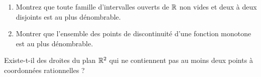 \documentclass[a4paper,12pt,reqno]{amsart}
\begin{document}
\begin{exo} %

  \begin{enumerate}
    \item Montrez que toute famille d'intervalles ouverts de $\mathbb{R}$ non vides et deux à deux disjoints est au plus dénombrable.
    \item Montrer que l'ensemble des points de discontinuité d'une fonction monotone est au plus dénombrable.
  \end{enumerate}

\end{exo}

\begin{exo}  %

  Existe-t-il des droites du plan $\mathbb{R}^2$ qui ne contiennent pas au moins deux points à coordonnées rationnelles ?

\end{exo}
\end{document}
